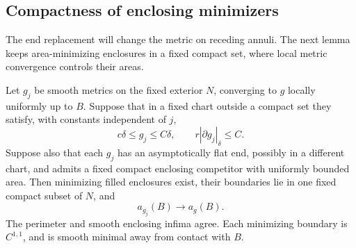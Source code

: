 \subsection{Compactness of enclosing minimizers}

The end replacement will change the metric on receding annuli.  The next
lemma keeps area-minimizing enclosures in a fixed compact set, where local
metric convergence controls their areas.

\begin{lemma}
\label{n3:reduction:area-compactness}
Let $g_j$ be smooth metrics on the fixed exterior $N$, converging to $g$
locally uniformly up to $B$.  Suppose that in a fixed chart outside a
compact set they satisfy, with constants independent of $j$,
\begin{equation}
 \label{n3:reduction:area-geometry}
 c\delta\le g_j\le C\delta,\qquad r|\partial g_j|_\delta\le C.
\end{equation}
Suppose also that each $g_j$ has an asymptotically flat end, possibly
in a different chart, and admits a fixed compact enclosing competitor
with uniformly bounded area.  Then minimizing filled enclosures exist,
their boundaries lie in one fixed compact subset of $N$, and
\[
 a_{g_j}(B)\longrightarrow a_g(B).
\]
The perimeter and smooth enclosing infima agree.  Each minimizing
boundary is $C^{1,1}$, and is smooth minimal away from contact with $B$.
\end{lemma}

